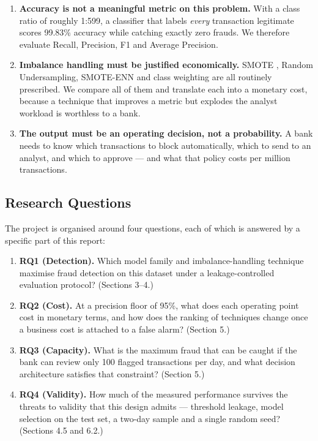 \begin{enumerate}
    \item \textbf{Accuracy is not a meaningful metric on this problem.} With a
    class ratio of roughly 1:599, a classifier that labels \emph{every}
    transaction legitimate scores 99.83\% accuracy while catching exactly zero
    frauds. We therefore evaluate Recall, Precision, F1 and Average Precision.
    \item \textbf{Imbalance handling must be justified economically.} SMOTE
    \cite{Chawla2002}, Random Undersampling, SMOTE-ENN
    \cite{Guo2008} and class weighting are all routinely prescribed. We compare
    all of them and translate each into a monetary cost, because a technique that
    improves a metric but explodes the analyst workload is worthless to a bank.
    \item \textbf{The output must be an operating decision, not a probability.} A
    bank needs to know which transactions to block automatically, which to send
    to an analyst, and which to approve --- and what that policy costs per
    million transactions.
\end{enumerate}

\subsection{Research Questions}

The project is organised around four questions, each of which is answered
by a specific part of this report:

\begin{enumerate}
    \item \textbf{RQ1 (Detection).} Which model family and imbalance-handling
    technique maximise fraud detection on this dataset under a leakage-controlled
    evaluation protocol? (Sections 3--4.)
    \item \textbf{RQ2 (Cost).} At a precision floor of 95\%, what does each
    operating point cost in monetary terms, and how does the ranking of
    techniques change once a business cost is attached to a false alarm?
    (Section 5.)
    \item \textbf{RQ3 (Capacity).} What is the maximum fraud that can be
    caught if the bank can review only 100 flagged transactions per day, and
    what decision architecture satisfies that constraint? (Section 5.)
    \item \textbf{RQ4 (Validity).} How much of the measured performance
    survives the threats to validity that this design admits --- threshold
    leakage, model selection on the test set, a two-day sample and a single
    random seed? (Sections 4.5 and 6.2.)
\end{enumerate}


